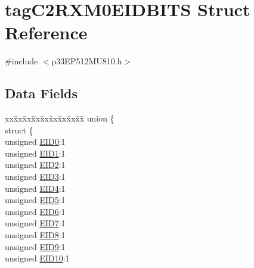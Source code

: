 \hypertarget{structtag_c2_r_x_m0_e_i_d_b_i_t_s}{}\section{tag\+C2\+R\+X\+M0\+E\+I\+D\+B\+I\+TS Struct Reference}
\label{structtag_c2_r_x_m0_e_i_d_b_i_t_s}


{\ttfamily \#include $<$p33\+E\+P512\+M\+U810.\+h$>$}

\subsection*{Data Fields}
\begin{DoxyCompactItemize}
\item 
\begin{tabbing}
xx\=xx\=xx\=xx\=xx\=xx\=xx\=xx\=xx\=\kill
union \{\\
\>struct \{\\
\>\>unsigned \hyperlink{structtag_c2_r_x_m0_e_i_d_b_i_t_s_a9da8b7b30247e4f9cd8cc056549aa9fd}{EID0}:1\\
\>\>unsigned \hyperlink{structtag_c2_r_x_m0_e_i_d_b_i_t_s_afd6c139491d147c1262f3d051c6691e9}{EID1}:1\\
\>\>unsigned \hyperlink{structtag_c2_r_x_m0_e_i_d_b_i_t_s_a36ec62d8d3c5acd5d15e6691dc099a94}{EID2}:1\\
\>\>unsigned \hyperlink{structtag_c2_r_x_m0_e_i_d_b_i_t_s_ab895f7d0ac289a0383b607cbc62eebe2}{EID3}:1\\
\>\>unsigned \hyperlink{structtag_c2_r_x_m0_e_i_d_b_i_t_s_a136d5a709d6618d40acceccb43036656}{EID4}:1\\
\>\>unsigned \hyperlink{structtag_c2_r_x_m0_e_i_d_b_i_t_s_a8dffb2d86a6c184df505ae7c71a58710}{EID5}:1\\
\>\>unsigned \hyperlink{structtag_c2_r_x_m0_e_i_d_b_i_t_s_af8a8574102515d8f1a4b7fd1685d0532}{EID6}:1\\
\>\>unsigned \hyperlink{structtag_c2_r_x_m0_e_i_d_b_i_t_s_a84c3262e67f8d5fd387ac10bde6fa9b1}{EID7}:1\\
\>\>unsigned \hyperlink{structtag_c2_r_x_m0_e_i_d_b_i_t_s_acca25e0b7d86eb499d01f85222baea87}{EID8}:1\\
\>\>unsigned \hyperlink{structtag_c2_r_x_m0_e_i_d_b_i_t_s_ac6748f73d4ada8538b06548be4f396c2}{EID9}:1\\
\>\>unsigned \hyperlink{structtag_c2_r_x_m0_e_i_d_b_i_t_s_a9cea8e77ecbb72bd3b08102412793725}{EID10}:1\\

\end{tabbing}
\end{DoxyCompactItemize}

